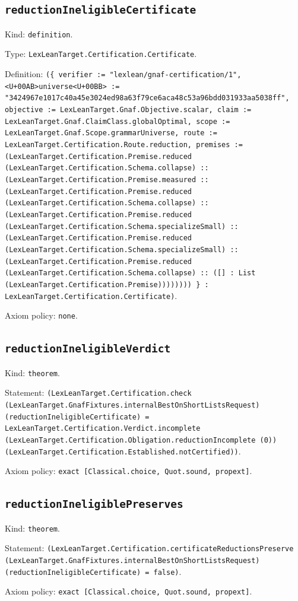 \documentclass[11pt]{article}
\begin{document}
\subsection*{\texttt{reductionIneligibleCertificate}}
\noindent Kind: \texttt{definition}.\par
\noindent Type: \texttt{LexLeanTarget.Certification.Certificate}.\par
\noindent Definition: \texttt{(\{ verifier := "lexlean/gnaf-certification/1", <U+00AB>universe<U+00BB> := "3424967e1017c40a45e3024ed98a63f79ce6aca48c53a96bdd031933aa5038ff", objective := LexLeanTarget.Gnaf.Objective.scalar, claim := LexLeanTarget.Gnaf.ClaimClass.globalOptimal, scope := LexLeanTarget.Gnaf.Scope.grammarUniverse, route := LexLeanTarget.Certification.Route.reduction, premises := (LexLeanTarget.Certification.Premise.reduced (LexLeanTarget.Certification.Schema.collapse) :: (LexLeanTarget.Certification.Premise.measured :: (LexLeanTarget.Certification.Premise.reduced (LexLeanTarget.Certification.Schema.collapse) :: (LexLeanTarget.Certification.Premise.reduced (LexLeanTarget.Certification.Schema.specializeSmall) :: (LexLeanTarget.Certification.Premise.reduced (LexLeanTarget.Certification.Schema.specializeSmall) :: (LexLeanTarget.Certification.Premise.reduced (LexLeanTarget.Certification.Schema.collapse) :: ([] : List (LexLeanTarget.Certification.Premise)))))))) \} : LexLeanTarget.Certification.Certificate)}.\par
\noindent Axiom policy: \texttt{none}.\par
\subsection*{\texttt{reductionIneligibleVerdict}}
\noindent Kind: \texttt{theorem}.\par
\noindent Statement: \texttt{(LexLeanTarget.Certification.check (LexLeanTarget.GnafFixtures.internalBestOnShortListsRequest) (reductionIneligibleCertificate) = LexLeanTarget.Certification.Verdict.incomplete (LexLeanTarget.Certification.Obligation.reductionIncomplete (0)) (LexLeanTarget.Certification.Established.notCertified))}.\par
\noindent Axiom policy: \texttt{exact [Classical.choice, Quot.sound, propext]}.\par
\subsection*{\texttt{reductionIneligiblePreserves}}
\noindent Kind: \texttt{theorem}.\par
\noindent Statement: \texttt{(LexLeanTarget.Certification.certificateReductionsPreserve (LexLeanTarget.GnafFixtures.internalBestOnShortListsRequest) (reductionIneligibleCertificate) = false)}.\par
\noindent Axiom policy: \texttt{exact [Classical.choice, Quot.sound, propext]}.\par
\end{document}
